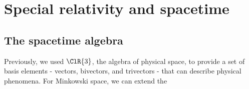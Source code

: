 \chapter{Special relativity and spacetime}

\section{The spacetime algebra}

Previously, we used $\ClR{3}$, the algebra of physical space, to provide a set of basis elements - 
vectors, bivectors, and trivectors - that can describe physical phenomena. For Minkowski space, we
can extend the 
